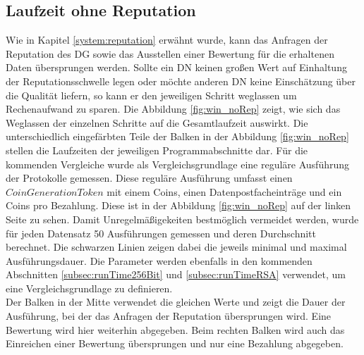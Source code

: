 \documentclass[
	fontsize=11pt,
	headings=small,
	parskip=half,           %
	bibliography=totoc,
	numbers=noenddot,       %
	open=any,               %
]{scrreprt}
\begin{document}
\subsection{Laufzeit ohne Reputation}
\label{subsec:noRep}
Wie in Kapitel \ref{system:reputation} erwähnt wurde, kann das Anfragen der Reputation des DG sowie das Ausstellen einer Bewertung für die erhaltenen Daten übersprungen werden. Sollte ein DN keinen großen Wert auf Einhaltung der Reputationsschwelle legen oder möchte anderen DN keine Einschätzung über die Qualität liefern, so kann er den jeweiligen Schritt weglassen um Rechenaufwand zu sparen. Die Abbildung \ref{fig:win_noRep} zeigt, wie sich das Weglassen der einzelnen Schritte auf die Gesamtlaufzeit auswirkt.
Die unterschiedlich eingefärbten Teile der Balken in der Abbildung \ref{fig:win_noRep} stellen die Laufzeiten der jeweiligen Programmabschnitte dar. Für die kommenden Vergleiche wurde als Vergleichsgrundlage eine reguläre Ausführung der Protokolle gemessen. Diese reguläre Ausführung umfasst einen $CoinGenerationToken$ mit einem Coins, einen Datenpostfacheinträge und ein Coins pro Bezahlung. Diese ist in der Abbildung \ref{fig:win_noRep} auf der linken Seite zu sehen. Damit Unregelmäßigekeiten bestmöglich vermeidet werden, wurde für jeden Datensatz 50 Ausführungen gemessen und deren Durchschnitt berechnet. Die schwarzen Linien zeigen dabei die jeweils minimal und maximal Ausführungsdauer. Die Parameter werden ebenfalls in den kommenden Abschnitten \ref{subsec:runTime256Bit} und \ref{subsec:runTimeRSA} verwendet, um eine Vergleichsgrundlage zu definieren. \\
Der Balken in der Mitte verwendet die gleichen Werte und zeigt die Dauer der Ausführung, bei der das Anfragen der Reputation übersprungen wird. Eine Bewertung wird hier weiterhin abgegeben. Beim rechten Balken wird auch das Einreichen einer Bewertung übersprungen und nur eine Bezahlung abgegeben.
\end{document}

